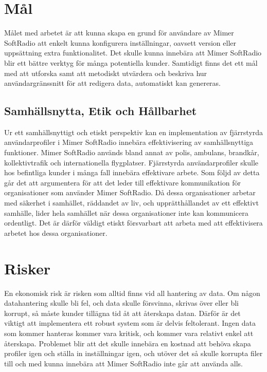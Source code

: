\section{Mål}
\label{sec:intro:mål}
Målet med arbetet är att kunna skapa en grund för användare av Mimer SoftRadio att enkelt kunna konfigurera inställningar, oavsett version eller uppsättning extra funktionalitet. Det skulle kunna innebära att Mimer SoftRadio blir ett bättre verktyg för många potentiella kunder. Samtidigt finns det ett mål med att utforska samt att metodiskt utvärdera och beskriva hur användargränssnitt för att redigera data, automatiskt kan genereras.

\subsection{Samhällsnytta, Etik och Hållbarhet}

Ur ett samhällsnyttigt och etiskt perspektiv kan en implementation av fjärrstyrda användarprofiler i Mimer SoftRadio innebära effektivisering av samhällsnyttiga funktioner. Mimer SoftRadio används bland annat av polis, ambulans, brandkår, kollektivtrafik och internationella flygplatser. Fjärrstyrda användarprofiler skulle hos befintliga kunder i många fall innebära effektivare arbete. Som följd av detta går det att argumentera för att det leder till effektivare kommunikation för organisationer som använder Mimer SoftRadio. Då dessa organisationer arbetar med säkerhet i samhället, räddandet av liv, och upprätthållandet av ett effektivt samhälle, lider hela samhället när dessa organisationer inte kan kommunicera ordentligt. Det är därför väldigt etiskt försvarbart att arbeta med att effektivisera arbetet hos dessa organisationer.

\section{Risker}
\label{sec:intro:risker}
En ekonomisk risk är risken som alltid finns vid all hantering av data. Om någon datahantering skulle bli fel, och data skulle försvinna, skrivas över eller bli korrupt, så måste kunder tillägna tid åt att återskapa datan. Därför är det viktigt att implementera ett robust system som är delvis feltolerant. Ingen data som kommer hanteras kommer vara kritisk, och kommer vara relativt enkel att återskapa. Problemet blir att det skulle innebära en kostnad att behöva skapa profiler igen och ställa in inställningar igen, och utöver det så skulle korrupta filer till och med kunna innebära att Mimer SoftRadio inte går att använda alls.

